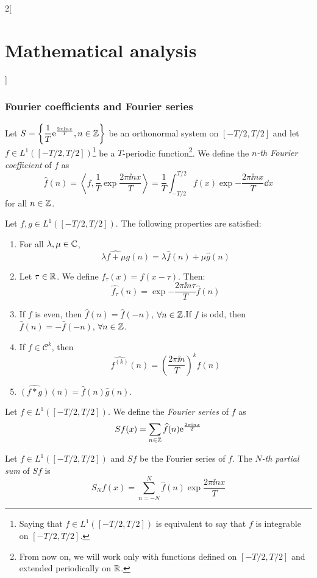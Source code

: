 \documentclass[../../../main.tex]{subfiles}
\begin{document}
\begin{multicols}{2}[\section{Mathematical analysis}]
  \subsubsection{Fourier coefficients and Fourier series}
  \begin{definition}
    Let $\displaystyle S=\left\{\frac{1}{T}\mathrm{e}^{\frac{2\pi\mathrm{i} nx}{T}},n\in\mathbb{Z} \right\}$ be an orthonormal system on $[-T/2,T/2]$ and let $f\in L^1([-T/2,T/2])$\footnote{Saying that $f\in L^1([-T/2,T/2])$ is equivalent to say that $f$ is integrable on $[-T/2,T/2]$.} be a $T$-periodic function\footnote{From now on, we will work only with functions defined on $[-T/2,T/2]$ and extended periodically on $\mathbb{R} $.}. We define the \emph{$n$-th Fourier coefficient} of $f$ as $$\widehat{f}(n)=\left\langle f,\frac{1}{T}\exp{\frac{2\pi\ii nx}{T}}\right\rangle=\frac{1}{T}\int_{-T/2}^{T/2}f(x)\exp{-\frac{2\pi\ii nx}{T}}\dd{x}$$ for all $n\in\mathbb{Z} $.
  \end{definition}
  \begin{proposition}
    Let $f,g\in L^1([-T/2,T/2])$. The following properties are satisfied:
    \begin{enumerate}
      \item For all $\lambda,\mu\in\mathbb{C} $, $$\widehat{\lambda f+\mu g}(n)=\lambda\widehat{f}(n)+\mu\widehat{g}(n)$$
      \item Let $\tau\in\mathbb{R} $. We define $f_\tau(x)=f(x-\tau)$. Then: $$\widehat{f_\tau}(n)=\exp{-\frac{2\pi\ii n\tau}{T}}\widehat{f}(n)$$
      \item If $f$ is even, then $\widehat{f}(n)=\widehat{f}(-n)$, $\forall n\in\mathbb{Z} $.\newline If $f$ is odd, then $\widehat{f}(n)=-\widehat{f}(-n)$, $\forall n\in\mathbb{Z} $.
      \item If $f\in \mathcal{C}^k$, then $$\widehat{f^{(k)}}(n)=\left(\frac{2\pi\ii n}{T}\right)^k\widehat{f}(n)$$
      \item $\widehat{(f*g)}(n)=\widehat{f}(n)\widehat{g}(n)$.
    \end{enumerate}
  \end{proposition}
  \begin{definition}
    Let $f\in L^1([-T/2,T/2])$. We define the \emph{Fourier series} of $f$ as $$\displaystyle Sf(x)=\sum_{n\in\mathbb{Z} }\widehat{f}(n)\mathrm{e}^{\frac{2\pi\mathrm{i} nx}{T}}$$
  \end{definition}
  \begin{definition}
    Let $f\in L^1([-T/2,T/2])$ and $Sf$ be the Fourier series of $f$. The \emph{$N$-th partial sum} of $Sf$ is $$S_Nf(x)=\sum_{n=-N}^N\widehat{f}(n)\exp{\frac{2\pi\ii nx}{T}}$$

\end{definition}
\end{multicols}
\end{document}
